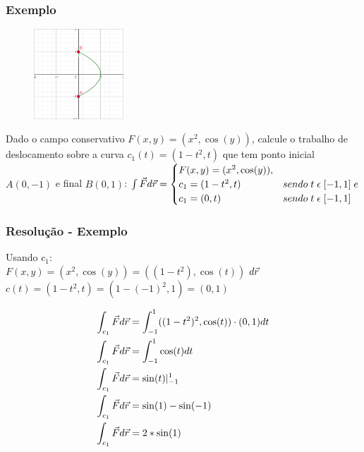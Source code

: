 \documentclass{beamer}
\def\vec{\mathaccent "017E\relax }
\begin{document}
\begin{frame}
    \frametitle{Exemplo} 

    \begin{figure} %
        \vspace{-35pt}
        \centering
        \caption{}
        \includegraphics[width=0.30\textwidth]{grafico-exemplo-1.png}
        \label{fig:grafico-exemplo1}
    \end{figure}

    Dado o campo conservativo $ F(x, y) = ( x^2, \cos(y) ) $, calcule o trabalho de deslocamento sobre a 
    curva $ c_1(t) = ( 1 - t^2, t ) $ que tem ponto inicial $ A(0, -1) $ e final $ B(0, 1) $:
    \hfill \break
    \hfill \break
    $
        \int{} \vec{F} d\vec{r} =  
        \begin{cases}
            F(x, y) = ( x^2, \cos(y) ),\\
            c_1 = ( 1 - t^2, t) &sendo \; t \; \epsilon \; [ -1, 1 ] \; e\\
            c_1 = ( 0, t)       &sendo \; t \; \epsilon \; [ -1, 1 ] \\
        \end{cases}
    $

\end{frame}

\begin{frame}
    \frametitle{Resolução - Exemplo} 
    Usando $ c_1 $: \\
    
    $ F(x, y) = ( x^2, \cos(y) ) = (( 1 - t^2 ), \cos(t) ) $
    \hfill \break
    $ d\vec{r} $
    \hfill \break
    $ c(t) = ( 1 - t^2, t ) = ( 1 - (-1)^2 , 1) = ( 0, 1 ) $
    \hfill \break

    \begin{align*}   
    \int_{c_1} \vec{F} d\vec{r} &= \int_{-1}^1 (( 1 - t^2)^2, \cos(t) ) \cdot ( 0, 1 ) dt \\
    \int_{c_1} \vec{F} d\vec{r} &= \int_{-1}^1 \cos(t) dt  \\
    \int_{c_1} \vec{F} d\vec{r} &= \sin(t)\vert_{-1}^{1} \\
    \int_{c_1} \vec{F} d\vec{r} &= \sin(1) - \sin(-1) \\
    \int_{c_1} \vec{F} d\vec{r} &= 2 * \sin(1) \\
    \end{align*}

\end{frame}
\end{document}
